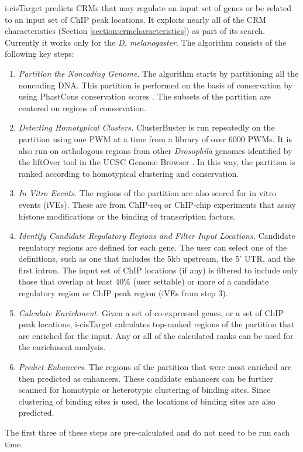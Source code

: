 \documentclass{frontiersENG} %
\begin{document}
i-cisTarget \cite{Herrmann2012} predicts CRMs that may regulate an
input set of genes or be related to an input set of ChIP peak
locations. It exploits nearly all of the CRM characteristics (Section
\ref{section:crmcharacteristics}) as part of its search. Currently it
works only for the \textit{D. melanogaster}. The algorithm consists of
the following key steps:
\begin{enumerate}
\item{\textit{Partition the Noncoding Genome.} The algorithm starts by
  partitioning all the noncoding DNA. This partition is performed on
  the basis of conservation by using PhastCons conservation scores
  \cite{Siepel2005}. The subsets of the partition are centered on
  regions of conservation.}
\item{\textit{Detecting Homotypical Clusters.} ClusterBuster
  \cite{Frith2003} is run repeatedly on the partition using one PWM at
  a time from a library of over 6000 PWMs. It is also run on
  orthologous regions from other \textit{Drosophila} genomes identified
  by the liftOver tool in the UCSC Genome Browser
  \cite{Rosenbloom2008}. In this way, the partition is ranked
  according to homotypical clustering and conservation.}
\item{\textit{In Vitro Events.} The regions of the partition are also
  scored for in vitro events (iVEs). These are from ChIP-seq or
  ChIP-chip experiments that assay histone modifications or the
  binding of transcription factors.}
\item{\textit{Identify Candidate Regulatory Regions and Filter Input
    Locations.} Candidate regulatory regions are defined for each
  gene. The user can select one of the definitions, such as one that includes the 5kb
  upstream, the 5' UTR, and the first intron. The input set of ChIP
  locations (if any) is filtered to include only those that overlap at
  least 40\% (user settable) or more of a candidate regulatory region
  or ChIP peak region (iVEs from step 3).}
\item{\textit{Calculate Enrichment.} Given a set of co-expressed
  genes, or a set of ChIP peak locations, i-cisTarget calculates
  top-ranked regions of the partition that are enriched for the
  input. Any or all of the calculated ranks can be used for the
  enrichment analysis.}
\item{\textit{Predict Enhancers.} The regions of the partition that
  were most enriched are then predicted as enhancers. These candidate
  enhancers can be further scanned for homotypic or heterotypic
  clustering of binding sites. Since clustering of binding sites is
  used, the locations of binding sites are also predicted.}
\end{enumerate}
The first three of these steps are pre-calculated and do not need to
be run each time.
\end{document}
